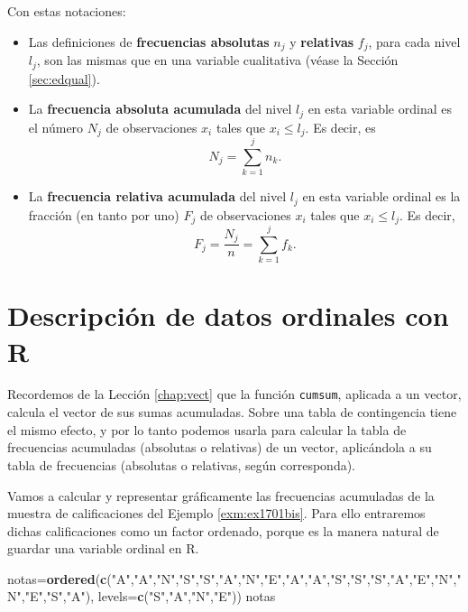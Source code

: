 \documentclass[]{book}
\newenvironment{Shaded}{\begin{snugshade}}{\end{snugshade}}
\newcommand{\DataTypeTok}[1]{\textcolor[rgb]{0.13,0.29,0.53}{#1}}
\newcommand{\KeywordTok}[1]{\textcolor[rgb]{0.13,0.29,0.53}{\textbf{#1}}}
\newcommand{\NormalTok}[1]{#1}
\newcommand{\StringTok}[1]{\textcolor[rgb]{0.31,0.60,0.02}{#1}}
\theoremstyle{definition}
\theoremstyle{definition}
\theoremstyle{definition}
\theoremstyle{remark}
\let\BeginKnitrBlock\begin \let\EndKnitrBlock\end
\begin{document}
Con estas notaciones:

\begin{itemize}
\item
  Las definiciones de \textbf{frecuencias absolutas} \(n_j\) y \textbf{relativas} \(f_j\), para cada nivel \(l_j\),
  son las mismas que en una variable cualitativa (véase la Sección \ref{sec:edqual}).
\item
  La \textbf{frecuencia absoluta acumulada} del nivel \(l_j\) en esta variable ordinal es el número \(N_j\) de observaciones \(x_i\) tales que \(x_i\leqslant l_j\). Es decir,
  es
  \[N_j=\sum\limits_{k=1}^j n_k.\]
\item
  La \textbf{frecuencia relativa acumulada} del nivel \(l_j\) en esta variable ordinal es la fracción (en tanto por uno) \(F_j\) de observaciones \(x_i\) tales que \(x_i\leqslant l_j\). Es decir,
  \[
  F_j=\dfrac{N_j}{n}=\sum\limits_{k=1}^j f_k.
  \]
\end{itemize}

\hypertarget{descripcion-de-datos-ordinales-con-r}{%
\section{Descripción de datos ordinales con R}\label{descripcion-de-datos-ordinales-con-r}}

Recordemos de la Lección \ref{chap:vect} que la función \texttt{cumsum}, aplicada a un vector, calcula el vector de sus sumas acumuladas. Sobre una tabla de contingencia tiene el mismo efecto, y por lo tanto podemos usarla para calcular la tabla de frecuencias acumuladas (absolutas o relativas) de un vector, aplicándola a su tabla de frecuencias (absolutas o relativas, según corresponda).

\BeginKnitrBlock{example}
\protect\hypertarget{exm:ex1ordinales}{}{\label{exm:ex1ordinales} }Vamos a calcular y representar gráficamente las frecuencias acumuladas de la muestra de calificaciones del Ejemplo \ref{exm:ex1701bis}. Para ello entraremos dichas calificaciones como un factor ordenado, porque es la manera natural de guardar una variable ordinal en R.
\EndKnitrBlock{example}

\begin{Shaded}
\begin{Highlighting}[]
\NormalTok{notas=}\KeywordTok{ordered}\NormalTok{(}\KeywordTok{c}\NormalTok{(}\StringTok{"A"}\NormalTok{,}\StringTok{"A"}\NormalTok{,}\StringTok{"N"}\NormalTok{,}\StringTok{"S"}\NormalTok{,}\StringTok{"S"}\NormalTok{,}\StringTok{"A"}\NormalTok{,}\StringTok{"N"}\NormalTok{,}\StringTok{"E"}\NormalTok{,}\StringTok{"A"}\NormalTok{,}\StringTok{"A"}\NormalTok{,}\StringTok{"S"}\NormalTok{,}\StringTok{"S"}\NormalTok{,}\StringTok{"S"}\NormalTok{,}\StringTok{"A"}\NormalTok{,}\StringTok{"E"}\NormalTok{,}\StringTok{"N"}\NormalTok{,}\StringTok{"N"}\NormalTok{,}\StringTok{"E"}\NormalTok{,}\StringTok{"S"}\NormalTok{,}\StringTok{"A"}\NormalTok{), }
              \DataTypeTok{levels=}\KeywordTok{c}\NormalTok{(}\StringTok{"S"}\NormalTok{,}\StringTok{"A"}\NormalTok{,}\StringTok{"N"}\NormalTok{,}\StringTok{"E"}\NormalTok{))}
\NormalTok{notas}
\end{Highlighting}
\end{Shaded}
\end{document}
